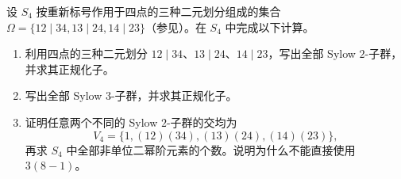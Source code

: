 \begin{exercise}\label{b1:ex:05-sylow-s4}
	设 \(S_4\) 按重新标号作用于四点的三种二元划分组成的集合 \(\Omega=\{12\mid34,13\mid24,14\mid23\}\)（参见）。在 \(S_4\) 中完成以下计算。
	\begin{enumerate}
		\item 利用四点的三种二元划分 \(12\mid34\)、\(13\mid24\)、\(14\mid23\)，写出全部 Sylow \(2\)-子群，并求其正规化子。
		\item 写出全部 Sylow \(3\)-子群，并求其正规化子。
		\item 证明任意两个不同的 Sylow \(2\)-子群的交均为
			\[
				V_4=\bigl\{1,(12)(34),(13)(24),(14)(23)\bigr\},
			\]
			再求 \(S_4\) 中全部非单位二幂阶元素的个数。说明为什么不能直接使用 \(3(8-1)\)。
	\end{enumerate}
\end{exercise}
